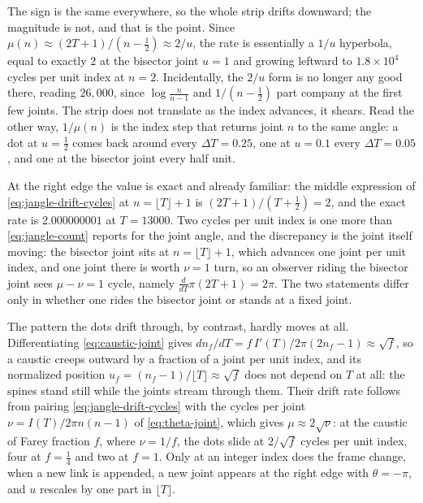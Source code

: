 \documentclass[11pt]{article}
\theoremstyle{definition}
\begin{document}
The sign is the same everywhere, so the whole strip drifts downward; the
magnitude is not, and that is the point. Since
$\mu(n)\approx(2T+1)/(n-\tfrac12)\approx2/u$, the rate is essentially a $1/u$
hyperbola, equal to exactly $2$ at the bisector joint $u=1$ and growing leftward
to $1.8\times10^{4}$ cycles per unit index at $n=2$. Incidentally, the
$2/u$ form is no longer any good there, reading $26{,}000$, since
$\log\frac{n}{n-1}$ and $1/(n-\tfrac12)$ part company at the first few joints.
The strip does not translate as the index advances, it shears. Read the other
way, $1/\mu(n)$ is the index step that returns joint $n$ to the same angle: a
dot at $u=\tfrac12$ comes back around every $\Delta T=0.25$, one at $u=0.1$
every $\Delta T=0.05$, and one at the bisector joint every half unit.

At the right edge the value is exact and already familiar: the middle expression
of \eqref{eq:jangle-drift-cycles} at $n=\lfloor T\rfloor+1$ is
$(2T+1)/(T+\tfrac12)=2$, and the exact rate is $2.000000001$ at $T=13000$. Two
cycles per unit index is one more than \eqref{eq:jangle-count} reports for the
joint angle, and the discrepancy is the joint itself moving: the bisector joint sits at
$n=\lfloor T\rfloor+1$, which advances one joint per unit index, and one joint
there is worth $\nu=1$ turn, so an observer riding the bisector joint sees $\mu-\nu=1$
cycle, namely $\frac{d}{dT}\pi(2T+1)=2\pi$. The two statements differ only in
whether one rides the bisector joint or stands at a fixed joint.

The pattern the dots drift through, by contrast, hardly moves at all.
Differentiating \eqref{eq:caustic-joint} gives
$dn_f/dT=f\,I'(T)\big/2\pi(2n_f-1)\approx\sqrt f$, so a caustic creeps outward
by a fraction of a joint per unit index, and its normalized position
$u_f=(n_f-1)/\lfloor T\rfloor\approx\sqrt f$ does not depend on $T$ at all: the
spines stand still while the joints stream through them. Their drift rate
follows from pairing \eqref{eq:jangle-drift-cycles} with the cycles per joint
$\nu=I(T)/2\pi n(n-1)$ of \eqref{eq:theta-joint}, which gives
$\mu\approx2\sqrt\nu$: at the caustic of Farey fraction $f$, where $\nu=1/f$,
the dots slide at $2/\sqrt f$ cycles per unit index, four at $f=\tfrac14$ and
two at $f=1$. Only at an integer index does the frame change, when a new link is
appended, a new joint appears at the right edge with $\theta=-\pi$, and $u$
rescales by one part in $\lfloor T\rfloor$.
\end{document}

